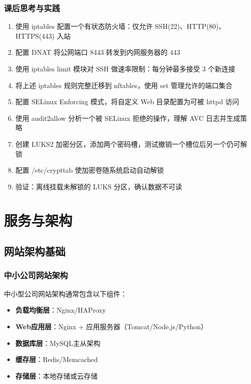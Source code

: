 \documentclass[12pt,UTF8]{ctexbook}
\begin{document}
\section{课后思考与实践}
\label{sec:security-advanced-practice}
\begin{enumerate}
    \item 使用 iptables 配置一个有状态防火墙：仅允许 SSH(22)、HTTP(80)、HTTPS(443) 入站
    \item 配置 DNAT 将公网端口 8443 转发到内网服务器的 443
    \item 使用 iptables limit 模块对 SSH 做速率限制：每分钟最多接受 3 个新连接
    \item 将上述 iptables 规则完整迁移到 nftables，使用 set 管理允许的端口集合
    \item 配置 SELinux Enforcing 模式，将自定义 Web 目录配置为可被 httpd 访问
    \item 使用 audit2allow 分析一个被 SELinux 拒绝的操作，理解 AVC 日志并生成策略
    \item 创建 LUKS2 加密分区，添加两个密码槽，测试撤销一个槽位后另一个仍可解锁
    \item 配置 /etc/crypttab 使加密卷随系统启动自动解锁
    \item 验证：离线挂载未解锁的 LUKS 分区，确认数据不可读
\end{enumerate}

\part{服务与架构}

\chapter{网站架构基础}
\label{chap:web-architecture}

\section{中小公司网站架构}
\label{sec:small-company-arch}

中小型公司网站架构通常包含以下组件：

\begin{itemize}
    \item \textbf{负载均衡层}：Nginx/HAProxy
    \item \textbf{Web应用层}：Nginx + 应用服务器（Tomcat/Node.js/Python）
    \item \textbf{数据库层}：MySQL主从架构
    \item \textbf{缓存层}：Redis/Memcached
    \item \textbf{存储层}：本地存储或云存储
\end{itemize}
\end{document}
